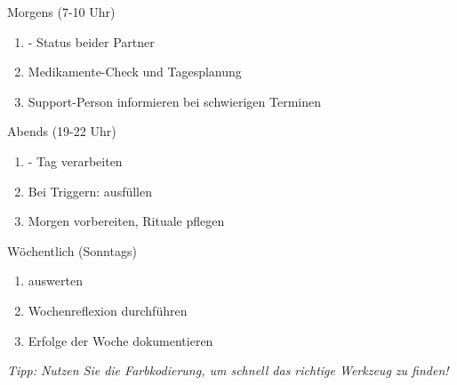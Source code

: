 \begin{ctmmGreenBox}{Morgens (7-10 Uhr)}
\begin{enumerate}
    \item {} - Status beider Partner
    \item Medikamente-Check und Tagesplanung
    \item Support-Person informieren bei schwierigen Terminen
\end{enumerate}
\end{ctmmGreenBox}

\begin{ctmmYellowBox}{Abends (19-22 Uhr)}
\begin{enumerate}
    \item {} - Tag verarbeiten %
    \item Bei Triggern:  ausfüllen
    \item Morgen vorbereiten, Rituale pflegen
\end{enumerate}
\end{ctmmYellowBox}

\begin{ctmmRedBox}{Wöchentlich (Sonntags)}
\begin{enumerate}
    \item {} auswerten
    \item Wochenreflexion durchführen %
    \item Erfolge der Woche dokumentieren
\end{enumerate}
\end{ctmmRedBox}

\vspace{0.5cm}

\textit{Tipp: Nutzen Sie die Farbkodierung, um schnell das richtige Werkzeug zu finden!}
